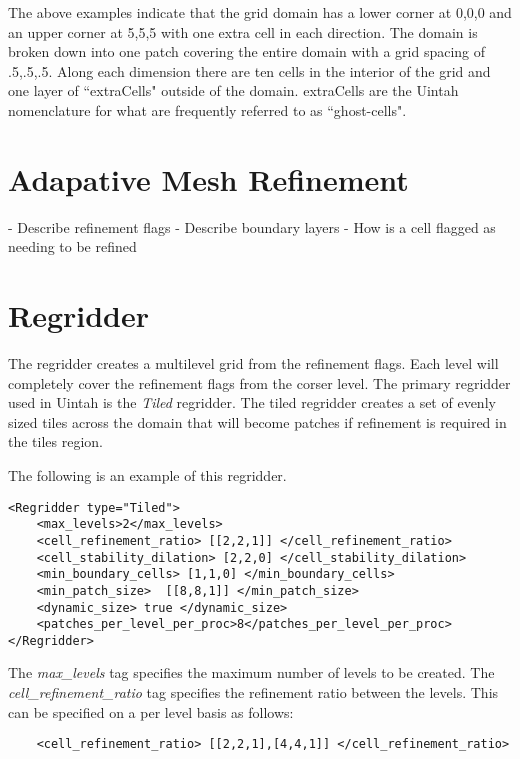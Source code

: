 The above examples indicate that the grid domain has a lower corner at
0,0,0 and an upper corner at 5,5,5 with one extra cell in each
direction.  The domain is broken down into one patch covering the
entire domain with a grid spacing of .5,.5,.5.  Along each dimension
there are ten cells in the interior of the grid and one layer of
``extraCells" outside of the domain.  extraCells are the Uintah nomenclature
for what are frequently referred to as ``ghost-cells".

%
\section{Adapative Mesh Refinement}
- Describe refinement flags
- Describe boundary layers
- How is a cell flagged as needing to be refined
%
\section{Regridder}

The regridder creates a multilevel grid from the refinement flags.
Each level will completely cover the refinement flags from the corser
level.  The primary regridder used in Uintah is the \emph{Tiled} regridder.
The tiled regridder creates a set of evenly sized tiles across the domain
that will become patches if refinement is required in the tiles region.

The following is an example of this regridder.

\begin{Verbatim}     
<Regridder type="Tiled">   
    <max_levels>2</max_levels>
    <cell_refinement_ratio> [[2,2,1]] </cell_refinement_ratio>
    <cell_stability_dilation> [2,2,0] </cell_stability_dilation>
    <min_boundary_cells> [1,1,0] </min_boundary_cells>
    <min_patch_size>  [[8,8,1]] </min_patch_size>
    <dynamic_size> true </dynamic_size>      
    <patches_per_level_per_proc>8</patches_per_level_per_proc>   
</Regridder>
\end{Verbatim}

The \emph{max\_levels} tag specifies the maximum number of levels
to be created.  The \emph{cell\_refinement\_ratio} tag specifies the 
refinement ratio between the levels.  This can be specified on a per 
level basis as follows:

\begin{Verbatim}
    <cell_refinement_ratio> [[2,2,1],[4,4,1]] </cell_refinement_ratio>
\end{Verbatim}

